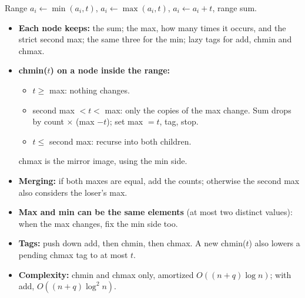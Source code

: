 Range $a_i \gets \min(a_i, t)$, $a_i \gets \max(a_i, t)$,
$a_i \gets a_i + t$, range sum.
\begin{itemize}
\item \textbf{Each node keeps:} the sum; the max, how many times it
  occurs, and the strict second max; the same three for the min;
  lazy tags for add, chmin and chmax.
\item \textbf{chmin($t$) on a node inside the range:}
  \begin{itemize}
  \item $t \ge$ max: nothing changes.
  \item second max $< t <$ max: only the copies of the max change.
    Sum drops by count $\times$ (max $- t$); set max $= t$, tag, stop.
  \item $t \le$ second max: recurse into both children.
  \end{itemize}
  chmax is the mirror image, using the min side.
\item \textbf{Merging:} if both maxes are equal, add the counts;
  otherwise the second max also considers the loser's max.
\item \textbf{Max and min can be the same elements} (at most two
  distinct values): when the max changes, fix the min side too.
\item \textbf{Tags:} push down add, then chmin, then chmax. A new
  chmin($t$) also lowers a pending chmax tag to at most $t$.
\item \textbf{Complexity:} chmin and chmax only, amortized
  $O((n + q) \log n)$; with add, $O((n + q) \log^2 n)$.
\end{itemize}
